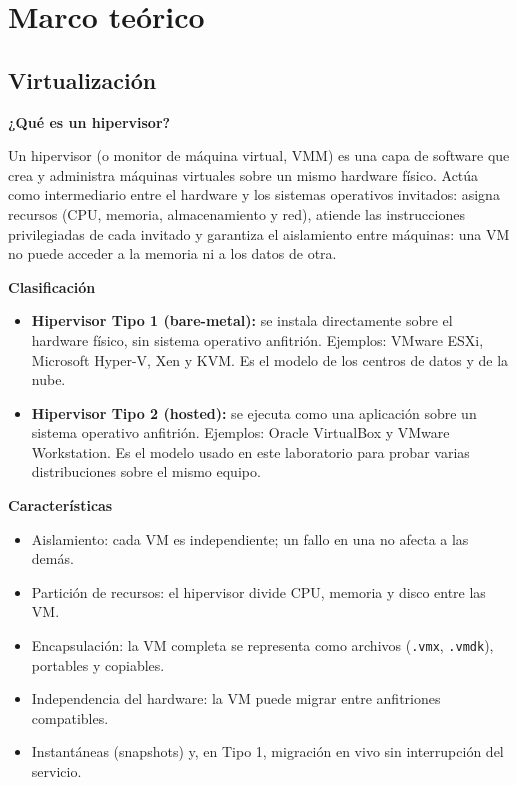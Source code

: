 \documentclass[11pt,a4paper]{report}
\begin{document}
\section{Marco teórico}

\subsection{Virtualización}

\textbf{¿Qué es un hipervisor?}

Un hipervisor (o monitor de máquina virtual, VMM) es una capa de software que crea y administra máquinas virtuales sobre un mismo hardware físico. Actúa como intermediario entre el hardware y los sistemas operativos invitados: asigna recursos (CPU, memoria, almacenamiento y red), atiende las instrucciones privilegiadas de cada invitado y garantiza el aislamiento entre máquinas: una VM no puede acceder a la memoria ni a los datos de otra.

\textbf{Clasificación}

\begin{itemize}
  \item \textbf{Hipervisor Tipo 1 (bare-metal):} se instala directamente sobre el hardware físico, sin sistema operativo anfitrión. Ejemplos: VMware ESXi, Microsoft Hyper-V, Xen y KVM. Es el modelo de los centros de datos y de la nube.
  \item \textbf{Hipervisor Tipo 2 (hosted):} se ejecuta como una aplicación sobre un sistema operativo anfitrión. Ejemplos: Oracle VirtualBox y VMware Workstation. Es el modelo usado en este laboratorio para probar varias distribuciones sobre el mismo equipo.
\end{itemize}

\textbf{Características}

\begin{itemize}
  \item Aislamiento: cada VM es independiente; un fallo en una no afecta a las demás.
  \item Partición de recursos: el hipervisor divide CPU, memoria y disco entre las VM.
  \item Encapsulación: la VM completa se representa como archivos (\texttt{.vmx}, \texttt{.vmdk}), portables y copiables.
  \item Independencia del hardware: la VM puede migrar entre anfitriones compatibles.
  \item Instantáneas (snapshots) y, en Tipo 1, migración en vivo sin interrupción del servicio.
\end{itemize}
\end{document}
